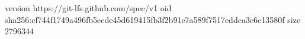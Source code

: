 version https://git-lfs.github.com/spec/v1
oid sha256:cf744f1749a496fb5ecde45d619415fb3f2b91e7a589f7517eddca3c6e13580f
size 2796344
